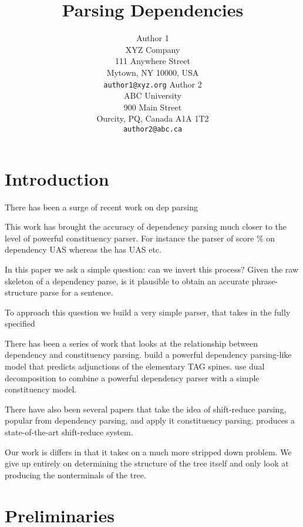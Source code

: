 \documentclass[11pt,letterpaper]{article}
\title{Parsing Dependencies}
\author{Author 1\\
	    XYZ Company\\
	    111 Anywhere Street\\
	    Mytown, NY 10000, USA\\
	    {\tt author1@xyz.org}
	  \And
	Author 2\\
  	ABC University\\
  	900 Main Street\\
  	Ourcity, PQ, Canada A1A 1T2\\
  {\tt author2@abc.ca}}
\date{}
\begin{document}
\maketitle
\begin{abstract}

\end{abstract}





\section{Introduction}


There has been a surge of recent work on dep parsing

\cite{}
\cite{}
\cite{}

This work has brought the accuracy of dependency parsing much closer to the level
of powerful constituency parser. For instance the parser of \cite{}
score \% on dependency UAS whereas the has UAS etc.


In this paper we ask a simple question: can we invert this process?
Given the raw skeleton of a dependency parse, is it plausible to obtain
an accurate phrase-structure parse for a sentence.

To approach this question we build a very simple parser,
that takes in the fully specified


There has been a series of work that looks at the relationship
between dependency and constituency parsing. \cite{carraers}
build a powerful dependency parsing-like model that predicts
adjunctions of the elementary TAG spines. \cite{rush} use
dual decomposition to combine a powerful dependency parser with
a simple constituency model.

There have also been several papers that take the idea of
shift-reduce parsing, popular from dependency parsing, and apply
 it constituency parsing. \cite{zpar} produces a state-of-the-art shift-reduce
system. \cite{stanford}

Our work is differs in that it takes on a much more stripped down problem.
We give up entirely on determining the structure of the tree itself and only
look at  producing the nonterminals of the tree.


\section{Preliminaries}
\end{document}
